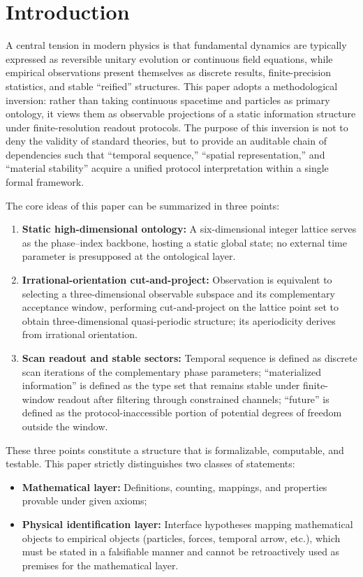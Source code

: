 \section{Introduction}

A central tension in modern physics is that fundamental dynamics are typically expressed as reversible unitary evolution or continuous field equations, while empirical observations present themselves as discrete results, finite-precision statistics, and stable ``reified'' structures. This paper adopts a methodological inversion: rather than taking continuous spacetime and particles as primary ontology, it views them as observable projections of a static information structure under finite-resolution readout protocols. The purpose of this inversion is not to deny the validity of standard theories, but to provide an auditable chain of dependencies such that ``temporal sequence,'' ``spatial representation,'' and ``material stability'' acquire a unified protocol interpretation within a single formal framework.

The core ideas of this paper can be summarized in three points:
\begin{enumerate}
  \item \textbf{Static high-dimensional ontology:} A six-dimensional integer lattice serves as the phase--index backbone, hosting a static global state; no external time parameter is presupposed at the ontological layer.
  \item \textbf{Irrational-orientation cut-and-project:} Observation is equivalent to selecting a three-dimensional observable subspace and its complementary acceptance window, performing cut-and-project on the lattice point set to obtain three-dimensional quasi-periodic structure; its aperiodicity derives from irrational orientation.
  \item \textbf{Scan readout and stable sectors:} Temporal sequence is defined as discrete scan iterations of the complementary phase parameters; ``materialized information'' is defined as the type set that remains stable under finite-window readout after filtering through constrained channels; ``future'' is defined as the protocol-inaccessible portion of potential degrees of freedom outside the window.
\end{enumerate}

These three points constitute a structure that is formalizable, computable, and testable. This paper strictly distinguishes two classes of statements:
\begin{itemize}
  \item \textbf{Mathematical layer:} Definitions, counting, mappings, and properties provable under given axioms;
  \item \textbf{Physical identification layer:} Interface hypotheses mapping mathematical objects to empirical objects (particles, forces, temporal arrow, etc.), which must be stated in a falsifiable manner and cannot be retroactively used as premises for the mathematical layer.
\end{itemize}
